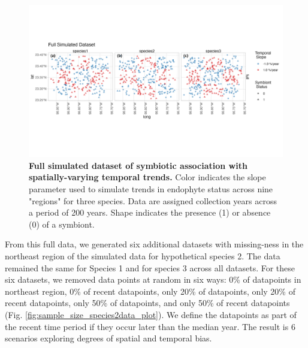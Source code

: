 \documentclass[11pt]{article}
\begin{document}
{\begin{figure}[H]
	\centering
	\includegraphics[width = \linewidth]{../Plots/sample_size_fulldata_plot.png}
	\caption[Full simulated dataset of symbiotic association with spatially-varying temporal trends]{\textbf{Full simulated dataset of symbiotic association with spatially-varying temporal trends.} Color indicates the slope parameter used to simulate trends in endophyte status across nine "regions" for three species. Data are assigned collection years across a period of 200 years. Shape indicates the presence (1) or absence (0) of a symbiont.}
	\label{fig:sample_size_fulldata_plot}
\end{figure}

From this full data, we generated six additional datasets with missing-ness in the northeast region of the simulated data for hypothetical species 2.
The data remained the same for Species 1 and for species 3 across all datasets.
For these six datasets, we removed data points at random in six ways: 0\% of datapoints in northeast region, 0\% of  recent datapoints, only 20\% of datapoints, only 20\% of recent datapoints, only 50\% of datapoints, and only 50\% of recent datapoints (Fig. \ref{fig:sample_size_species2data_plot}).
We define the datapoints as part of the recent time period if they occur later than the median year.
The result is 6 scenarios exploring degrees of spatial and temporal bias. 


}
\end{document}
